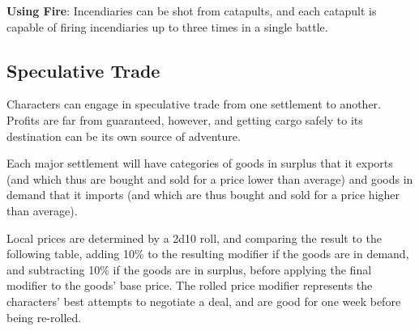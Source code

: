 \documentclass{book}
\begin{document}
\textbf{Using Fire}: Incendiaries can be shot from catapults, and each
catapult is capable of firing incendiaries up to three times in a single
battle.

\subsection*{Speculative Trade}\label{speculative-trade}

Characters can engage in speculative trade from one settlement to
another. Profits are far from guaranteed, however, and getting cargo
safely to its destination can be its own source of adventure.

Each major settlement will have categories of goods in surplus that it
exports (and which thus are bought and sold for a price lower than
average) and goods in demand that it imports (and which are thus bought
and sold for a price higher than average).

Local prices are determined by a 2d10 roll, and comparing the result to
the following table, adding 10\% to the resulting modifier if the goods
are in demand, and subtracting 10\% if the goods are in surplus, before
applying the final modifier to the goods' base price. The rolled price
modifier represents the characters' best attempts to negotiate a deal,
and are good for one week before being re-rolled.
\end{document}
